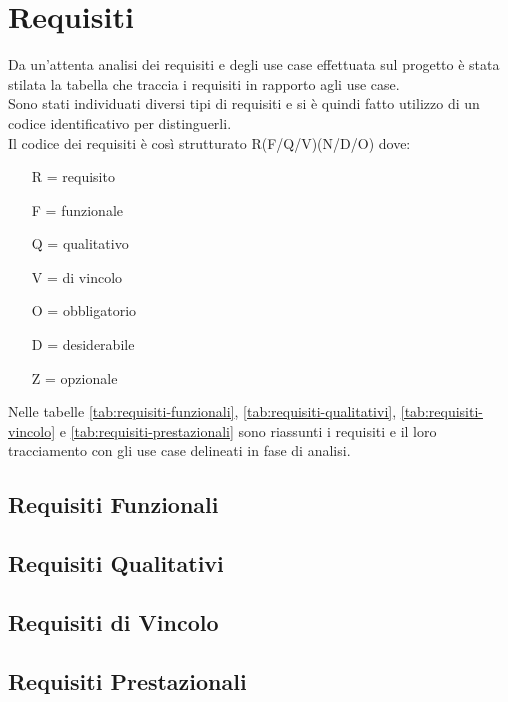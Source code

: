 \section{Requisiti}

Da un'attenta analisi dei requisiti e degli use case effettuata sul progetto è stata stilata la tabella che traccia i requisiti in rapporto agli use case.\\
Sono stati individuati diversi tipi di requisiti e si è quindi fatto utilizzo di un codice identificativo per distinguerli.\\
Il codice dei requisiti è così strutturato R(F/Q/V)(N/D/O) dove:
\begin{enumerate}
	\item[R =] requisito
    \item[F =] funzionale
    \item[Q =] qualitativo
    \item[V =] di vincolo
    \item[O =] obbligatorio
    \item[D =] desiderabile
    \item[Z =] opzionale
\end{enumerate}
Nelle tabelle \ref{tab:requisiti-funzionali}, \ref{tab:requisiti-qualitativi}, \ref{tab:requisiti-vincolo} e \ref{tab:requisiti-prestazionali} sono riassunti i requisiti e il loro tracciamento con gli use case delineati in fase di analisi.

\newpage

\subsection{Requisiti Funzionali}

\subsection{Requisiti Qualitativi}

\subsection{Requisiti di Vincolo}

\subsection{Requisiti Prestazionali}

